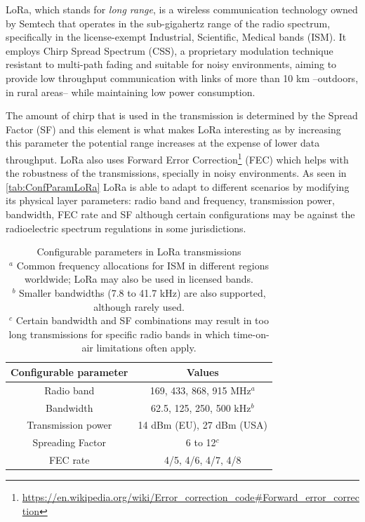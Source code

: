 LoRa, which stands for \textit{long range}, is a wireless communication technology owned by Semtech that operates in the sub-gigahertz range of the radio spectrum, specifically in the license-exempt Industrial, Scientific, Medical bands (ISM). It employs Chirp Spread Spectrum (CSS), a proprietary modulation technique resistant to multi-path fading and suitable for noisy environments, aiming to provide low throughput communication with links of more than 10 km –outdoors, in rural areas– while maintaining low power consumption.\cite{Augustin2016}

The amount of chirp that is used in the transmission is determined by the Spread Factor (SF) and this element is what makes LoRa interesting as by increasing this parameter the potential range increases at the expense of lower data throughput. 
LoRa also uses Forward Error Correction\footnote{\url{https://en.wikipedia.org/wiki/Error\_correction\_code\#Forward\_error\_correction}} (FEC) which helps with the robustness of the transmissions, specially in noisy environments.
As seen in \autoref{tab:ConfParamLoRa} LoRa is able to adapt to different scenarios by modifying its physical layer parameters: radio band and frequency, transmission power, bandwidth, FEC rate and SF although certain configurations may be against the radioelectric spectrum regulations in some jurisdictions.

\begin{table}[]
\centering
\begin{tabular}{|c|c|}
\hline
Configurable parameter & Values                    \\ \hline
Radio band             & 169, 433, 868, 915 MHz$^{a}$  \\ \hline
Bandwidth              & 62.5, 125, 250, 500 kHz$^{b}$ \\ \hline
Transmission power     & 14 dBm (EU), 27 dBm (USA) \\ \hline
Spreading Factor       & 6 to 12$^{c}$                 \\ \hline
FEC rate               & 4/5, 4/6, 4/7, 4/8        \\ \hline
\end{tabular}
\caption[Configurable parameters in LoRa transmissions]{Configurable parameters in LoRa transmissions \\
$^{a}$  Common frequency allocations for ISM in different regions worldwide; LoRa may also be used in licensed bands. \\
$^{b}$  Smaller bandwidths (7.8 to 41.7 kHz) are also supported, although rarely used. \\
$^{c}$  Certain bandwidth and SF combinations may result in too long transmissions for specific radio bands in which time-on-air limitations often apply.}
\label{tab:ConfParamLoRa}
\cite{StarOfStars}
\end{table}

